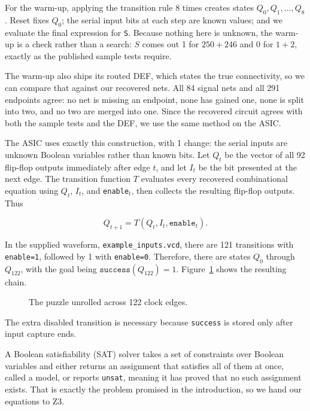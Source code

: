 \documentclass[11pt]{article}
\newcommand{\fitwidth}[1]{\resizebox{\ifdim\width>\linewidth\linewidth\else\width\fi}{!}{#1}}
\begin{document}
For the warm-up, applying the transition rule 8 times creates states $Q_{0},Q_{1},\ldots,Q_{8}$. Reset fixes $Q_{0}$; the serial input bits at each step are known values; and we evaluate the final expression for \texttt{S}. Because nothing here is unknown, the warm-up is a check rather than a search: $S$ comes out 1 for $250+246$ and 0 for $1+2$, exactly as the published sample tests require.

The warm-up also ships its routed DEF, which states the true connectivity, so we can compare that against our recovered nets. All 84 signal nets and all 291 endpoints agree: no net is missing an endpoint, none has gained one, none is split into two, and no two are merged into one. Since the recovered circuit agrees with both the sample tests and the DEF, we use the same method on the ASIC.

The ASIC uses exactly this construction, with 1 change: the serial inputs are unknown Boolean variables rather than known bits. Let $Q_t$ be the vector of all 92 flip-flop outputs immediately after edge $t$, and let $I_t$ be the bit presented at the next edge. The transition function $T$ evaluates every recovered combinational equation using $Q_t$, $I_t$, and \texttt{enable}$_t$, then collects the resulting flip-flop outputs. Thus

\[
  Q_{t+1}=T\left(Q_{t},I_{t},\texttt{enable}_{t}\right).
\]

In the supplied waveform, \texttt{example\_inputs.vcd}, there are 121 transitions with \texttt{enable=1}, followed by 1 with \texttt{enable=0}. Therefore, there are states $Q_{0}$ through $Q_{122}$, with the goal being $\texttt{success}\left(Q_{122}\right)=1$. Figure~\ref{fig:unrolling} shows the resulting chain.

\begin{figure}[H]
  \centering
  \fitwidth{}
  \caption{The puzzle unrolled across 122 clock edges.}
  \label{fig:unrolling}
\end{figure}

The extra disabled transition is necessary because \texttt{success} is stored only after input capture ends.

A Boolean satisfiability (SAT) solver takes a set of constraints over Boolean variables and either returns an assignment that satisfies all of them at once, called a model, or reports \texttt{unsat}, meaning it has proved that no such assignment exists. That is exactly the problem promised in the introduction, so we hand our equations to Z3.
\end{document}
